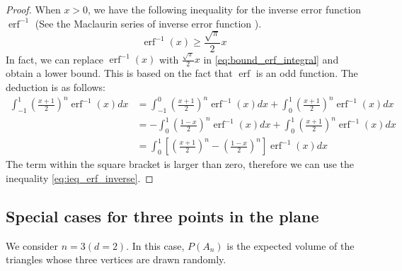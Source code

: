 \documentclass{article}
\DeclareMathOperator{\erf}{erf}
\begin{document}
\begin{proof}
    When $x>0$, we have the following inequality
    for the inverse error function $\erf^{-1}$
    (See the Maclaurin series of inverse error function
    \cite{inverseErf}).
    \begin{equation}\label{eq:ieq_erf_inverse}
        \erf^{-1}(x) \geq \frac{\sqrt{\pi}}{2}x
    \end{equation}
    In fact, we can replace
    $\erf^{-1}(x)$
    with $\frac{\sqrt{\pi}}{2}x$
    in \eqref{eq:bound_erf_integral} and obtain
    a lower bound.  This is based on the fact
    that $\erf$ is an odd function.
    The deduction is as follows:
    \begin{align*}  
        \int_{-1}^{1}
    \left(\frac{x+1}{2} \right)^n
    \erf^{-1} (x)dx
    &= \int_{-1}^{0}
    \left(\frac{x+1}{2} \right)^n
    \erf^{-1} (x)dx
    +\int_{0}^{1}
    \left(\frac{x+1}{2} \right)^n
    \erf^{-1} (x)dx \\
    &=-\int_{0}^{1}
    \left(\frac{1-x}{2} \right)^n
    \erf^{-1} (x)dx
    +\int_{0}^{1}
    \left(\frac{x+1}{2} \right)^n
    \erf^{-1} (x)dx \\
    &=    
    \int_{0}^{1}
    \left[\left(\frac{x+1}{2} \right)^n-
    \left(\frac{1-x}{2} \right)^n\right]
    \erf^{-1} (x)dx
    \end{align*}
    The term within the square bracket is larger
    than zero, therefore we can use
    the inequality \eqref{eq:ieq_erf_inverse}.

\end{proof}

\subsection{
Special cases for three points in the plane
}
We consider $n=3 (d=2)$.
In this case, $P(A_n)$
is the expected volume of the triangles
whose three vertices are drawn randomly.
\end{document}
